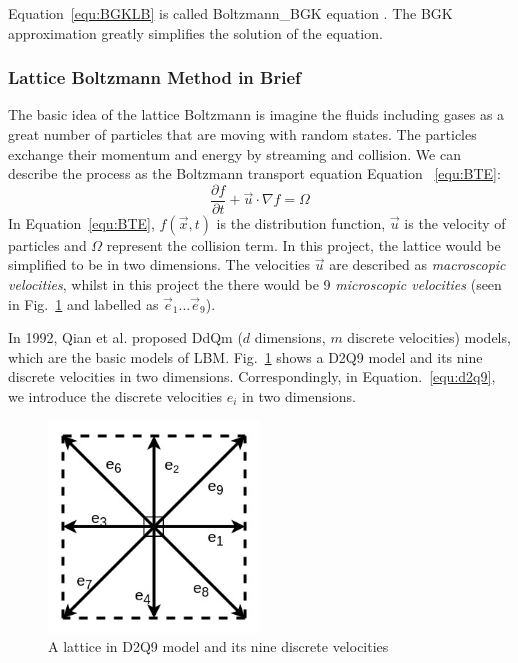 Equation~\ref{equ:BGKLB} is called Boltzmann\_BGK equation \cite{chew1956boltzmann}. The BGK approximation greatly simplifies the solution of the equation.

\subsubsection{Lattice Boltzmann Method in Brief} \label{sec:lbmb}
The basic idea of the lattice Boltzmann is imagine the fluids including gases as a great number of particles that are moving with random states. The particles exchange their momentum and energy by streaming and collision. We can describe the process as the Boltzmann transport equation Equation ~\ref{equ:BTE}:
\begin{equation}
\label{equ:BTE}
    \frac{\partial f}{\partial t} + \vec{u}\cdot \nabla f = \Omega
\end{equation}
In Equation~\ref{equ:BTE}, $f(\vec{x}, t)$ is the distribution function, $\vec{u}$ is the velocity of particles and $\Omega$ represent the collision term. In this project, the lattice would be simplified to be in two dimensions. The velocities $\vec{u}$ are described as \textit{macroscopic velocities}, whilst in this project the there would be 9 \textit{microscopic velocities} (seen in Fig.~\ref{fig:d2q9} and labelled as $\vec{e}_1...\vec{e}_9$). 

In 1992, Qian et al. \cite{d2q9} proposed DdQm ($d$ dimensions, $m$ discrete velocities) models, which are the basic models of LBM. Fig.~\ref{fig:d2q9} shows a D2Q9 model and its nine discrete velocities in two dimensions. Correspondingly, in Equation.~\ref{equ:d2q9}, we introduce the discrete velocities $e_i$ in two dimensions.



\begin{figure}[!tb]
   \centering
       \includegraphics[width=0.5\textwidth]{figures/nine_direction.jpg}
       \caption{A lattice in D2Q9 model and its nine discrete velocities}
       \label{fig:d2q9}
\end{figure}

